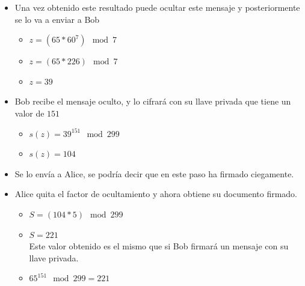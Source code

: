 \begin{itemize}
\begin{itemize}
\end{itemize}
\item Una vez obtenido este resultado puede ocultar este mensaje y posteriormente se lo va a enviar a Bob

\begin{itemize}

\item $ z = (65 * 60^{7}) \mod 7 $

\item $ z = (65 * 226) \mod 7 $

\item $ z = 39 $

\end{itemize}

\item Bob recibe el mensaje oculto, y lo cifrará con su llave privada que tiene un valor de $ 151 $

\begin{itemize}

\item $ s(z) = 39^{151} \mod 299 $

\item $ s(z) = 104 $

\end{itemize}

\item Se lo envía a Alice, se podría decir que en este paso ha firmado ciegamente.

\item Alice quita el factor de ocultamiento y ahora obtiene su documento firmado.

\begin{itemize}

\item $ S = ( 104 * 5 ) \mod 299 $

\item $ S = 221 $ \\

Este valor obtenido es el mismo que si Bob firmará un mensaje con su llave privada.

\item $ 65^{151} \mod 299 = 221 $

\end{itemize}

\end{itemize}





